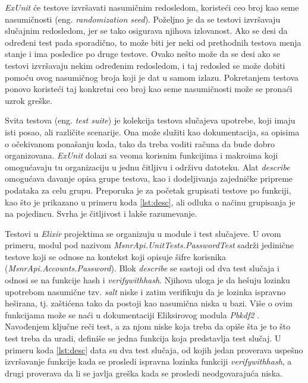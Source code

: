 \documentclass[12pt,oneside]{memoir}
\begin{document}
\par \emph{ExUnit} će testove izvršavati nasumičnim redosledom, koristeći ceo broj kao seme nasumičnosti (eng. \emph{randomization seed}). Poželjno je da se testovi izvršavaju slučajnim redosledom, jer se tako osigurava njihova izlovanost. Ako se desi da određeni test pada sporadično, to može biti jer neki od prethodnih testova menja stanje i ima posledice po druge testove. Ovako nešto može da se desi ako se testovi izvršavaju nekim određenim redosledom, i taj redosled se može dobiti pomoću ovog nasumičnog broja koji je dat u samom izlazu. Pokretanjem testova ponovo koristeći taj konkretni ceo broj kao seme nasumičnosti može se pronaći uzrok greške. 

\par Svita testova (eng. \emph{test suite}) je kolekcija testova slučajeva upotrebe, koji imaju isti posao, ali različite scenarije. Ona može služiti kao dokumentacija, sa opisima o očekivanom ponašanju koda, tako da treba voditi računa da bude dobro organizovana. \emph{ExUnit} dolazi sa veoma korisnim funkcijima i makroima koji omogućavaju tu organizaciju u jednu čitljivu i održivu datoteku. Alat \emph{describe} omogućava davanje opisa grupe testova, kao i dodeljivanja zajedničke pripreme podataka za celu grupu. Preporuka je za početak grupisati testove po funkciji, kao što je prikazano u primeru koda \ref{lst:desc}, ali odluka o načinu grupisanja je na pojedincu. Svrha je čitljivost i lakše razumevanje.
\par Testovi u \emph{Elixir} projektima se organizuju u module i test slučajeve. U ovom primeru, modul pod nazivom \emph{MsnrApi.UnitTests.PasswordTest} sadrži jedinične testove koji se odnose na kontekst koji opisuje šifre korisnika (\emph{MsnrApi.Accounts.Password}). Blok \emph{describe} se sastoji od dva test slučaja i odnosi se na funkcije hash i \emph{verify{\textunderscore}with{\textunderscore}hash}. Njihova uloga je da hešuju lozinku upotrebom nasumične tzv. \emph{salt} niske i zatim verifikuju da je lozinka ispravno heširana, tj. zaštićena tako da postoji kao nasumična niska u bazi. Više o ovim funkcijama može se naći u dokumentaciji Eliksirovog modula \emph{Pbkdf2} \cite{pbk}. Navođenjem ključne reči test, a za njom niske koja treba da opiše šta je to što test treba da uradi, definiše se jedna funkcija koja predstavlja test slučaj. U primeru koda \ref{lst:desc} data su dva test slučaja, od kojih jedan proverava uspešno izvršavanje funkcije kada se prosledi ispravna lozinka funkciji \emph{verify{\textunderscore}with{\textunderscore}hash}, a drugi proverava da li se javlja greška kada se prosledi neodgovarajuća niska. 
 
\end{document}
